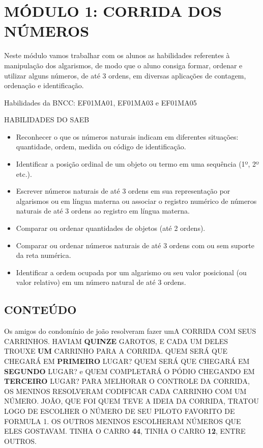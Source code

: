 \section{MÓDULO 1: CORRIDA DOS
NÚMEROS}\label{muxf3dulo-1-corrida-dos-nuxfameros}

Neste módulo vamos trabalhar com os alunos as habilidades referentes à
manipulação dos algarismos, de modo que o aluno consiga formar, ordenar
e utilizar alguns números, de até 3 ordens, em diversas aplicações de
contagem, ordenação e identificação.

Habilidades da BNCC: EF01MA01, EF01MA03 e EF01MA05

HABILIDADES DO SAEB

\begin{itemize}
\item
  Reconhecer o que os números naturais indicam em diferentes situações:
  quantidade, ordem, medida ou código de identificação.
\item
  Identificar a posição ordinal de um objeto ou termo em uma sequência
  (1º, 2º etc.).
\item
  Escrever números naturais de até 3 ordens em sua representação por
  algarismos ou em língua materna ou associar o registro numérico de
  números naturais de até 3 ordens ao registro em língua materna.
\item
  Comparar ou ordenar quantidades de objetos (até 2 ordens).
\item
  Comparar ou ordenar números naturais de até 3 ordens com ou sem
  suporte da reta numérica.
\item
  Identificar a ordem ocupada por um algarismo ou seu valor posicional
  (ou valor relativo) em um número natural de até 3 ordens.
\end{itemize}

\subsection{CONTEÚDO}\label{conteuxfado}

Os amigos do condomínio de joão resolveram fazer umA CORRIDA COM SEUS
CARRINHOS. HAVIAM \textbf{QUINZE} GAROTOS, E CADA UM DELES TROUXE
\textbf{UM} CARRINHO PARA A CORRIDA. QUEM SERÁ QUE CHEGARÁ EM
\textbf{PRIMEIRO} LUGAR? QUEM SERÁ QUE CHEGARÁ EM \textbf{SEGUNDO}
LUGAR? e QUEM COMPLETARÁ O PÓDIO CHEGANDO EM \textbf{TERCEIRO} LUGAR?
PARA MELHORAR O CONTROLE DA CORRIDA, OS MENINOS RESOLVERAM CODIFICAR
CADA CARRINHO COM UM NÚMERO. JOÃO, QUE FOI QUEM TEVE A IDEIA DA CORRIDA,
TRATOU LOGO DE ESCOLHER O NÚMERO DE SEU PILOTO FAVORITO DE FORMULA 1. OS
OUTROS MENINOS ESCOLHERAM NÚMEROS QUE ELES GOSTAVAM. TINHA O CARRO
\textbf{44}, TINHA O CARRO \textbf{12}, ENTRE OUTROS.

